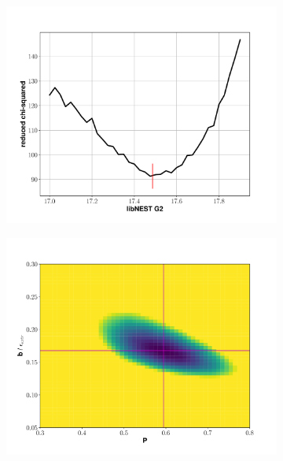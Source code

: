 {\begin{figure}[h!]
\begin{subfigure}{0.5\textwidth}
  \includegraphics[width=\textwidth]{Figures/S2tail_g2fit_dcm.pdf}
\end{subfigure}%
\begin{subfigure}{0.5\textwidth}
  \centering
  \includegraphics[width=\textwidth]{Figures/S2tail_heatmap_dcm.pdf}
\end{subfigure}
\begin{subfigure}{0.5\textwidth}
  \centering

\end{subfigure}
\end{figure}}

